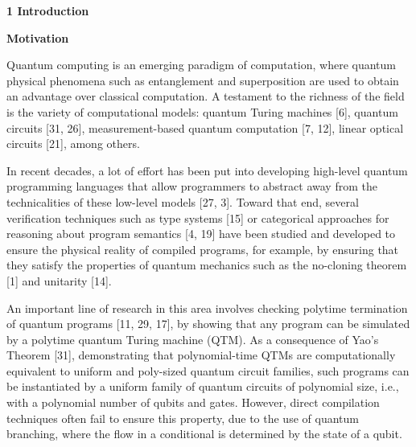 
 
\par\medskip\noindent\textbf{1 Introduction}\par
 
 
\par\medskip\noindent\textbf{Motivation}\par
 
 
Quantum computing is an emerging paradigm of computation, where quantum physical phenomena such as entanglement and superposition are used to obtain an advantage over classical computation. A testament to the richness of the field is the variety of computational models: quantum Turing machines [6], quantum circuits [31, 26], measurement-based quantum computation [7, 12], linear optical circuits [21], among others.\par
 
 
 
In recent decades, a lot of effort has been put into developing high-level quantum programming languages that allow programmers to abstract away from the technicalities of these low-level models [27, 3]. Toward that end, several verification techniques such as type systems [15] or categorical approaches for reasoning about program semantics [4, 19] have been studied and developed to ensure the physical reality of compiled programs, for example, by ensuring that they satisfy the properties of quantum mechanics such as the no-cloning theorem [1] and unitarity [14].\par
 
 
 
An important line of research in this area involves checking polytime termination of quantum programs [11, 29, 17], by showing that any program can be simulated by a polytime quantum Turing machine (QTM). As a consequence of Yao’s Theorem [31], demonstrating that polynomial-time QTMs are computationally equivalent to uniform and poly-sized quantum circuit families, such programs can be instantiated by a uniform family of quantum circuits of polynomial size, i.e., with a polynomial number of qubits and gates. However, direct compilation techniques often fail to ensure this property, due to the use of quantum branching, where the flow in a conditional is determined by the state of a qubit.\par
 
